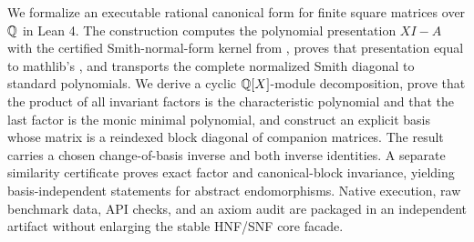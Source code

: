 We formalize an executable rational canonical form for finite square matrices
over $\mathbb{Q}$ in Lean 4.  The construction computes the polynomial presentation
$XI-A$ with the certified Smith-normal-form kernel from
, proves that presentation equal to mathlib's
, and transports the complete normalized Smith
diagonal to standard polynomials.  We derive a cyclic
$\mathbb{Q}[X]$-module decomposition, prove that the product of all invariant factors
is the characteristic polynomial and that the last factor is the monic
minimal polynomial, and construct an explicit basis whose matrix is a
reindexed block diagonal of companion matrices.  The result carries a chosen
change-of-basis inverse and both inverse identities.  A separate similarity
certificate proves exact factor and canonical-block invariance, yielding
basis-independent statements for abstract endomorphisms.  Native execution,
raw benchmark data, API checks, and an axiom audit are packaged in an
independent artifact without enlarging the stable HNF/SNF core facade.

